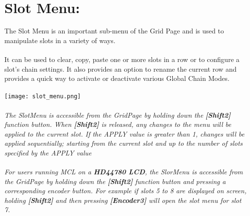 \chapter{Slot Menu:}

The Slot Menu is an important sub-menu of the Grid Page and is used to manipulate slots in a variety of ways.\\\\
It can be used to clear, copy, paste one or more slots in a row or to configure a slot's chain settings. It also provides an option to rename the current row and provides a quick way to activate or deactivate various Global Chain Modes.
\\\\
\texttt{[image: slot\_menu.png]}
\\\\
\textit{The SlotMenu is accessible from the GridPage by holding down the  \textbf{[Shift2]} function 
button. When  \textbf{[Shift2]} is released, any changes to the menu will be applied to the current slot. If the APPLY value is greater than 1, changes will be applied sequentially; starting from the current slot and up to the number of slots specified by the APPLY value}
\\\\
\textit{For users running MCL on a \textbf{HD44780 LCD}, the SlorMenu  is accessible from the GridPage by holding down the  \textbf{[Shift2]} function button and pressing a corresponding encoder button. For example if slots 5 to 8 are displayed on screen, holding  \textbf{[Shift2]} and then pressing \textbf{[Encoder3]} will open the slot menu for slot 7.}

